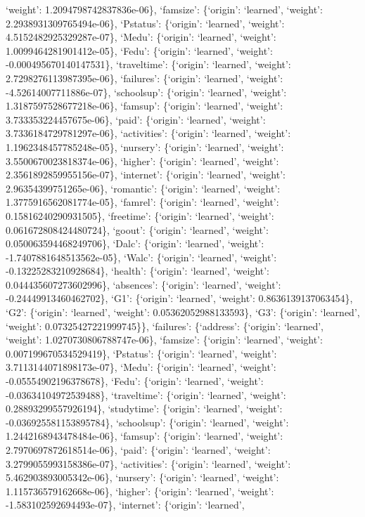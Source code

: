\documentclass[
]{article}
\begin{document}
`weight': 1.2094798742837836e-06\}, `famsize': \{`origin': `learned',
`weight': 2.2938931309765494e-06\}, `Pstatus': \{`origin': `learned',
`weight': 4.5152482925329287e-07\}, `Medu': \{`origin': `learned',
`weight': 1.0099464281901412e-05\}, `Fedu': \{`origin': `learned',
`weight': -0.000495670140147531\}, `traveltime': \{`origin': `learned',
`weight': 2.7298276113987395e-06\}, `failures': \{`origin': `learned',
`weight': -4.52614007711886e-07\}, `schoolsup': \{`origin': `learned',
`weight': 1.3187597528677218e-06\}, `famsup': \{`origin': `learned',
`weight': 3.733353224457675e-06\}, `paid': \{`origin': `learned',
`weight': 3.7336184729781297e-06\}, `activities': \{`origin': `learned',
`weight': 1.1962348457785248e-05\}, `nursery': \{`origin': `learned',
`weight': 3.5500670023818374e-06\}, `higher': \{`origin': `learned',
`weight': 2.3561892859955156e-07\}, `internet': \{`origin': `learned',
`weight': 2.96354399751265e-06\}, `romantic': \{`origin': `learned',
`weight': 1.3775916562081774e-05\}, `famrel': \{`origin': `learned',
`weight': 0.15816240290931505\}, `freetime': \{`origin': `learned',
`weight': 0.061672808424480724\}, `goout': \{`origin': `learned',
`weight': 0.050063594468249706\}, `Dalc': \{`origin': `learned',
`weight': -1.7407881648513562e-05\}, `Walc': \{`origin': `learned',
`weight': -0.13225283210928684\}, `health': \{`origin': `learned',
`weight': 0.044435607273602996\}, `absences': \{`origin': `learned',
`weight': -0.24449913460462702\}, `G1': \{`origin': `learned', `weight':
0.8636139137063454\}, `G2': \{`origin': `learned', `weight':
0.05362052988133593\}, `G3': \{`origin': `learned', `weight':
0.07325427221999745\}\}, `failures': \{`address': \{`origin': `learned',
`weight': 1.0270730806788747e-06\}, `famsize': \{`origin': `learned',
`weight': 0.007199670534529419\}, `Pstatus': \{`origin': `learned',
`weight': 3.7113144071898173e-07\}, `Medu': \{`origin': `learned',
`weight': -0.05554902196378678\}, `Fedu': \{`origin': `learned',
`weight': -0.03634104972539488\}, `traveltime': \{`origin': `learned',
`weight': 0.28893299557926194\}, `studytime': \{`origin': `learned',
`weight': -0.036925581153895784\}, `schoolsup': \{`origin': `learned',
`weight': 1.2442168943478484e-06\}, `famsup': \{`origin': `learned',
`weight': 2.7970697872618514e-06\}, `paid': \{`origin': `learned',
`weight': 3.2799055993158386e-07\}, `activities': \{`origin': `learned',
`weight': 5.462903893005342e-06\}, `nursery': \{`origin': `learned',
`weight': 1.115736579162668e-06\}, `higher': \{`origin': `learned',
`weight': -1.583102592694493e-07\}, `internet': \{`origin': `learned',
\end{document}
